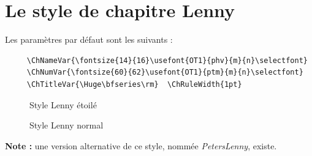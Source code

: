 \documentclass{report}
\begin{document}
    \section{Le style de chapitre Lenny}
    Les paramètres par défaut sont les suivants :
    {\small\begin{verbatim}
     \ChNameVar{\fontsize{14}{16}\usefont{OT1}{phv}{m}{n}\selectfont}
     \ChNumVar{\fontsize{60}{62}\usefont{OT1}{ptm}{m}{n}\selectfont}
     \ChTitleVar{\Huge\bfseries\rm}  \ChRuleWidth{1pt}
    \end{verbatim}}
    \begin{figure}[h]
      \begin{minipage}{7 cm}
        \centerline{\color{gray!25}} 
        \caption{Style Lenny \og étoilé \fg{}}
      \end{minipage}\hfill
      \begin{minipage}{7 cm}
        \centerline{\color{gray!25}}
        \caption{Style Lenny \og normal \fg{}}
      \end{minipage}\hfill
    \end{figure}
    \textbf{Note :} une version alternative de ce style, nommée 
    \textsl{PetersLenny}, existe.
\end{document}
